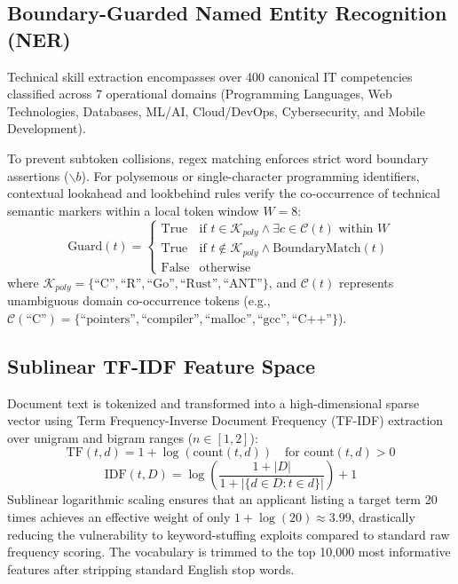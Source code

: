 \documentclass[conference]{IEEEtran}
\begin{document}
\subsection{Boundary-Guarded Named Entity Recognition (NER)}
Technical skill extraction encompasses over 400 canonical IT competencies classified across 7 operational domains (Programming Languages, Web Technologies, Databases, ML/AI, Cloud/DevOps, Cybersecurity, and Mobile Development).

To prevent subtoken collisions, regex matching enforces strict word boundary assertions ($\backslash b$). For polysemous or single-character programming identifiers, contextual lookahead and lookbehind rules verify the co-occurrence of technical semantic markers within a local token window $W = 8$:
\begin{equation}
\text{Guard}(t) = \begin{cases} 
\text{True} & \text{if } t \in \mathcal{K}_{poly} \land \exists c \in \mathcal{C}(t) \text{ within } W \\ 
\text{True} & \text{if } t \notin \mathcal{K}_{poly} \land \text{BoundaryMatch}(t) \\ 
\text{False} & \text{otherwise} 
\end{cases}
\end{equation}
where $\mathcal{K}_{poly} = \{\text{``C''}, \text{``R''}, \text{``Go''}, \text{``Rust''}, \text{``ANT''}\}$, and $\mathcal{C}(t)$ represents unambiguous domain co-occurrence tokens (e.g., $\mathcal{C}(\text{``C''}) = \{\text{``pointers''}, \text{``compiler''}, \text{``malloc''}, \text{``gcc''}, \text{``C++''}\}$).

\subsection{Sublinear TF-IDF Feature Space}
Document text is tokenized and transformed into a high-dimensional sparse vector using Term Frequency-Inverse Document Frequency (TF-IDF) extraction over unigram and bigram ranges ($n \in [1, 2]$):
\begin{equation}
\text{TF}(t, d) = 1 + \log(\text{count}(t, d)) \quad \text{for } \text{count}(t, d) > 0
\end{equation}
\begin{equation}
\text{IDF}(t, D) = \log\left(\frac{1 + |D|}{1 + |\{d \in D : t \in d\}|}\right) + 1
\end{equation}
Sublinear logarithmic scaling ensures that an applicant listing a target term 20 times achieves an effective weight of only $1 + \log(20) \approx 3.99$, drastically reducing the vulnerability to keyword-stuffing exploits compared to standard raw frequency scoring. The vocabulary is trimmed to the top 10,000 most informative features after stripping standard English stop words.
\end{document}
